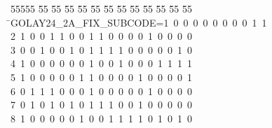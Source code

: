 %
%
\begin{tabbing}
55555 \= 55 \= 55 \= 55 \= 55 \= 55 \= 55 \= 55 \= 55 \= 55 \= 55 \= 55 \= 55 \= \>GOLAY24\_2A\_FIX\_SUBCODE=1\ 0\ 0\ 0\ 0\ 0\ 0\ 0\ 0\ 1\ 1\ \\[0pt]
2\ 1\ 0\ 0\ 1\ 1\ 0\ 0\ 1\ 1\ 0\ 0\ 0\ 0\ 1\ 0\ 0\ 0\ 0\ \\[0pt]
3\ 0\ 0\ 1\ 0\ 0\ 1\ 0\ 1\ 1\ 1\ 1\ 0\ 0\ 0\ 0\ 0\ 1\ 0\ \\[0pt]
4\ 1\ 0\ 0\ 0\ 0\ 0\ 0\ 1\ 0\ 0\ 1\ 0\ 0\ 0\ 1\ 1\ 1\ 1\ \\[0pt]
5\ 1\ 0\ 0\ 0\ 0\ 0\ 1\ 1\ 0\ 0\ 0\ 0\ 1\ 0\ 0\ 0\ 0\ 1\ \\[0pt]
6\ 0\ 1\ 1\ 1\ 0\ 0\ 0\ 1\ 0\ 0\ 0\ 0\ 0\ 1\ 0\ 0\ 0\ 0\ \\[0pt]
7\ 0\ 1\ 0\ 1\ 0\ 1\ 0\ 1\ 1\ 1\ 0\ 0\ 1\ 0\ 0\ 0\ 0\ 0\ \\[0pt]
8\ 1\ 0\ 0\ 0\ 0\ 0\ 1\ 0\ 0\ 1\ 1\ 1\ 1\ 0\ 1\ 0\ 1\ 0\ \\[0pt]

\end{tabbing}
